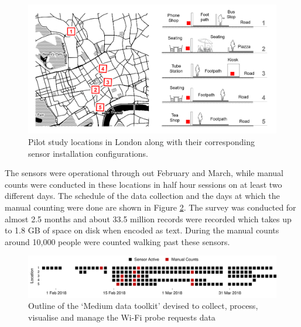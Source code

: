 \begin{figure}
  \centering
  \includegraphics[trim={20 20 20 20},clip, width=\textwidth]{images/pilot-study-locations.png}
  \caption{Pilot study locations in London along with their corresponding sensor installation configurations.}
  \label{figure:collection:pilot:locations}
\end{figure}

The sensors were operational through out February and March, while manual counts were conducted in these locations in half hour sessions on at least two different days.
The schedule of the data collection and the days at which the manual counting were done are shown in Figure \ref{figure:collection:pilot:schedule}.
The survey was conducted for almost 2.5 months and about 33.5 million records were recorded which takes up to 1.8 GB of space on disk when encoded as text.
During the manual counts around 10,000 people were counted walking past these sensors.

\begin{figure}
  \includegraphics{images/pilot-study-schedule.png}
  \caption{Outline of the `Medium data toolkit' devised to collect, process, visualise and manage the Wi-Fi probe requests data}
  \label{figure:collection:pilot:schedule}
\end{figure}


